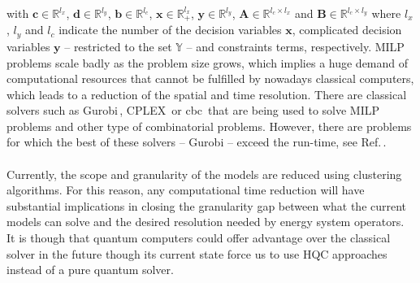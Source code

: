 with $\textbf{c}\in\mathbb{R}^{l_{x}}$, $\textbf{d}\in\mathbb{R}^{l_{y}}$, $\textbf{b}\in\mathbb{R}^{l_{c}}$, $\textbf{x}\in\mathbb{R}_{+}^{l_{x}}$, $\textbf{y}\in\mathbb{R}^{l_{y}}$, $\textbf{A}\in \mathbb{R}^{l_{c}\times l_{x}}$ and $\textbf{B}\in\mathbb{R}^{l_{c}\times l_{y}}$ where $l_{x}$, $l_{y}$ and $l_{c}$ indicate the number of the decision variables $\textbf{x}$, complicated decision variables $\textbf{y}$ -- restricted to the set $\mathbb{Y}$ -- and constraints terms, respectively. MILP problems scale badly as the problem size grows, which implies a huge demand of computational resources that cannot be fulfilled by nowadays classical computers, which leads to a reduction of the spatial and time resolution. There are classical solvers such as Gurobi\,\cite{gurobi}, CPLEX\,\cite{cplex2009v12} or cbc\,\cite{cbc} that are being used to solve MILP problems and other type of combinatorial problems. However, there are problems for which the best of these solvers -- Gurobi -- exceed the run-time, see Ref.\,\cite{Fernandez-Campoamor2021CommunityAnnealing}.\\\\
Currently, the scope and granularity of the models are reduced using clustering algorithms. For this reason, any computational time reduction will have substantial implications in closing the granularity gap between what the current models can solve and the desired resolution needed by energy system operators. It is though that quantum computers could offer advantage over the classical solver in the future though its current state force us to use HQC approaches instead of a pure quantum solver.
